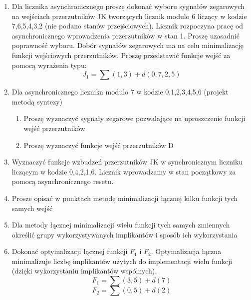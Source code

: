 \documentclass[a4paper]{article}
\begin{document}
\begin{enumerate}
\item Dla licznika asynchronicznego proszę dokonać wyboru sygnałów zegarowych na wejściach przerzutników JK tworzących licznik modulo 6 liczący w kodzie 7,6,5,4,3,2 (nie podano stanów przejściowych). Licznik rozpoczyna pracę od asynchronicznego wprowadzenia przerzutników w stan 1. Proszę uzasadnić poprawność wyboru. Dobór sygnałów zegarowych ma na celu minimalizację funkcji wejściowych przerzutników. Proszę przedstawić funkcje wejść za pomocą wyrażenia typu: $$J_1 = \sum (1,3) +d(0,7,2,5) $$
\item Dla asynchronicznego licznika modulo 7 w kodzie 0,1,2,3,4,5,6 (projekt metodą syntezy)
\begin{enumerate}
\item Proszę wyznaczyć sygnały zegarowe pozwalające na uproszczenie funkcji wejść przerzutników
\item Proszę wyznaczyć funkcje wejść przerzutników D
\end{enumerate}
\item Wyznaczyć funkcje wzbudzeń przerzutników JK w synchronicznym liczniku liczącym w kodzie 0,4,2,1,6. Licznik wprowadzamy w stan początkowy za pomocą asynchronicznego resetu.
\item Prosze opisać w punktach metodę minimalizacji łącznej kilku funkcji tych samych wejść
\item Dla metody łącznej minimalizacji wielu funkcji tych samych zmiennych określić grupy wykorzystywanych implikantów i sposób ich wykorzystania
\item Dokonać optymalizacji łącznej funkcji $F_1$ i $F_2$. Optymalizacja łączna minimalizuje liczbę implikantów użytych do implementacji wielu funkcji (dzięki wykorzystaniu implikantów wspólnych). $$F_1 = \sum (3,5)+d(7) $$ $$F_2 = \sum (0,5) +d(2) $$
\end{enumerate}
\end{document}

